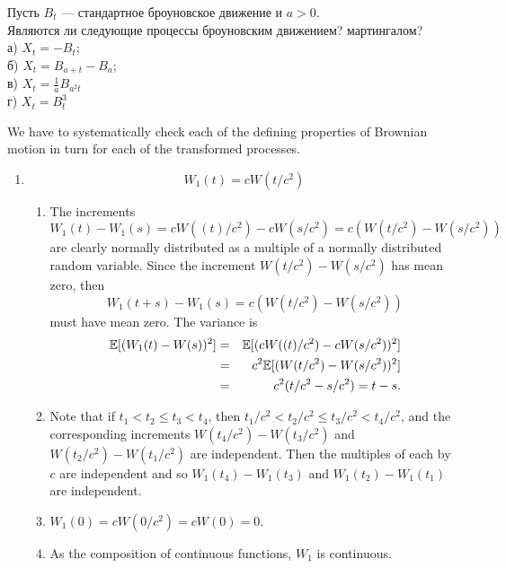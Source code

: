 \begin{problem}
Пусть $B_{t}$ — стандартное броуновское движение и $a>0$. \\
Являются ли следующие процессы броуновским движением? мартингалом? \\
а) $X_{t}=-B_{t}$; \\
б) $X_{t}=B_{a+t}-B_{a}$; \\
в) $X_{t}=\frac{1}{a}B_{a^{2}t}$ \\
г) $X_{t}=B_{t}^{3}$

\begin{sol}

We have to systematically check each of the defining properties
of Brownian motion in turn for each of the transformed processes.
\begin{enumerate}
  \item
    \[
      W_1(t) = cW(t/c^2)
    \]
    \begin{enumerate}
       \item
       The increments
       \[
         W_1(t) - W_1(s) = cW( (t)/c^2 ) - cW(s/c^2) = c
         ( W( t/c^2  ) - W( s/c^2 ))
       \]
       are clearly normally distributed as a multiple of a
       normally distributed random variable.  Since the
       increment $ W( t/c^2 ) - W( s/c^2 ) $ has
       mean zero, then
       \[
         W_1(t+s) - W_1(s) = c ( W( t/c^2 ) - W( s/c^2
         ))
       \]
       must have mean zero.  The variance is
       \begin{eqnarray*}
         \mathbb{E}[(W_1(t)-W(s))^2] &=& \mathbb{E}[(c W((t)/c^2) - c W(s/c^2))^2]
         \\
         &=& c^2 \mathbb{E}[ (W( t/c^2 ) - W(s/c^2))^2] \\
         &=& c^2 (t/c^2 - s/c^2) = t - s.
       \end{eqnarray*}

       \item
       Note that if $ t_1 < t_2 \le t_3 < t_4 $, then $ t_1/c^2
       < t_2/c^2 \le t_3/c^2 < t_4/c^2 $, and the corresponding
       increments $ W(t_4/c^2) - W(t_3/c^2) $ and $ W(t_2/c^2)
       - W(t_1/c^2) $ are independent.  Then the multiples of
       each by $ c $ are independent and so $ W_1(t_4) - W_1(t_3)
       $ and $ W_1(t_2) - W_1(t_1) $ are independent.

       \item
       $ W_1(0) = c W(0/c^2) = c W(0) = 0 $.

       \item
       As the composition of continuous functions, $ W_1 $ is
       continuous.
    \end{enumerate}


\end{enumerate}
\end{sol}
\end{problem}
